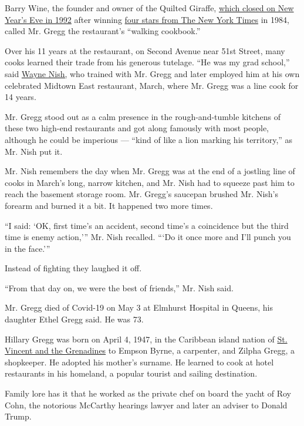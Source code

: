 Barry Wine, the founder and owner of the Quilted Giraffe,
\href{https://www.nytimes3xbfgragh.onion/1979/07/20/archives/the-quilted-giraffe.html}{which
closed on New Year's Eve in 1992} after winning
\href{https://www.nytimes3xbfgragh.onion/1984/01/20/arts/restaurants-187990.html}{four
stars from The New York Times} in 1984, called Mr. Gregg the
restaurant's ``walking cookbook.''

Over his 11 years at the restaurant, on Second Avenue near 51st Street,
many cooks learned their trade from his generous tutelage. ``He was my
grad school,'' said
\href{https://dinersjournal.blogs.nytimes3xbfgragh.onion/2009/02/09/nish-has-left-the-country/}{Wayne
Nish,} who trained with Mr. Gregg and later employed him at his own
celebrated Midtown East restaurant, March, where Mr. Gregg was a line
cook for 14 years.

Mr. Gregg stood out as a calm presence in the rough-and-tumble kitchens
of these two high-end restaurants and got along famously with most
people, although he could be imperious --- ``kind of like a lion marking
his territory,'' as Mr. Nish put it.

Mr. Nish remembers the day when Mr. Gregg was at the end of a jostling
line of cooks in March's long, narrow kitchen, and Mr. Nish had to
squeeze past him to reach the basement storage room. Mr. Gregg's
saucepan brushed Mr. Nish's forearm and burned it a bit. It happened two
more times.

``I said: `OK, first time's an accident, second time's a coincidence but
the third time is enemy action,''' Mr. Nish recalled. ```Do it once more
and I'll punch you in the face.'''

Instead of fighting they laughed it off.

``From that day on, we were the best of friends,'' Mr. Nish said.

Mr. Gregg died of Covid-19 on May 3 at Elmhurst Hospital in Queens, his
daughter Ethel Gregg said. He was 73.

Hillary Gregg was born on April 4, 1947, in the Caribbean island nation
of
\href{https://www.nytimes3xbfgragh.onion/topic/destination/saint-vincent-and-the-grenadines}{St.
Vincent and the Grenadines} to Empson Byrne, a carpenter, and Zilpha
Gregg, a shopkeeper. He adopted his mother's surname. He learned to cook
at hotel restaurants in his homeland, a popular tourist and sailing
destination.

Family lore has it that he worked as the private chef on board the yacht
of Roy Cohn, the notorious McCarthy hearings lawyer and later an adviser
to Donald Trump.


